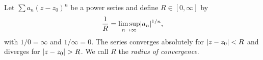 \begin{theorem}\label{thm:cauchy-hadamard}
  Let $\sum a_n (z - z_0)^n$ be a power series and define $R \in [0, \infty]$ by
  \[
    \frac{1}{R} = \limsup_{n \to \infty} \lvert a_n\rvert^{1/n},
  \]
  with $1/0 = \infty$ and $1/\infty = 0$. The series converges absolutely for
  $\lvert z - z_0\rvert < R$ and diverges for $\lvert z - z_0\rvert > R$. We call $R$ the
  \emph{radius of convergence}.
\end{theorem}
